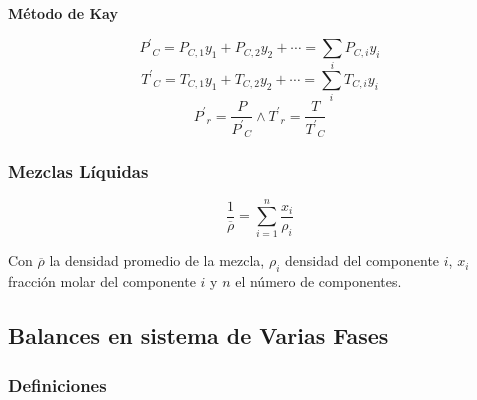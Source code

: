         \textbf{Método de Kay}
        
        \begin{quote}
            \textit{}
        \end{quote}
        
        \begin{equation}
        \label{eq:metodo_kay_p}
            {{P}^{'}}_{C} = P_{C, 1}y_{1} + P_{C, 2}y_{2} + \cdots = \sum_{i} P_{C, i}y_{i}
        \end{equation}
        \begin{equation}
        \label{eq:metodo_kay_t}
            {{T}^{'}}_{C} = T_{C, 1}y_{1} + T_{C, 2}y_{2} + \cdots = \sum_{i} T_{C, i}y_{i}
        \end{equation}
        \[{{P}^{'}}_{r} = \frac{P}{{{P}^{'}}_{C}} \wedge {{T}^{'}}_{r} = \frac{T}{{{T}^{'}}_{C}}\]
        
        \subsubsection{Mezclas Líquidas}
        
        \begin{equation}
        \label{eq:mezclas_liq}
            \frac{1}{\overline{\rho}} = \sum_{i=1}^{n} \frac{x_{i}}{\rho_{i}}
        \end{equation}
        
        Con \(\overline{\rho}\) la densidad promedio de la mezcla, \(\rho_{i}\) densidad del componente \(i\), \(x_{i}\) fracción molar del componente \(i\) y \(n\) el número de componentes.
    
    \subsection{Balances en sistema de Varias Fases}
        
        \subsubsection{Definiciones}
        
            
            \begin{quote}
                \textit{}
            \end{quote}
            
